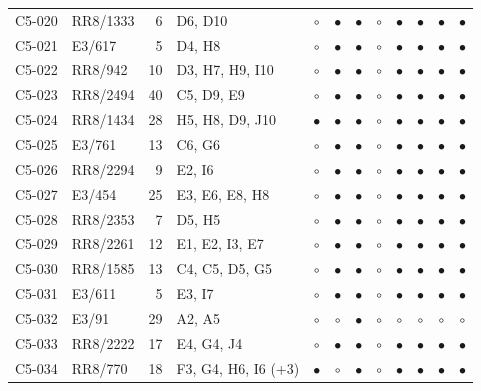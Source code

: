 {\begin{longtable}{llrp{3.9cm}cccccccc}
    C5-020 & RR8/1333 & 6 & D6, D10 & $\circ$ & $\bullet$ & $\bullet$ & $\circ$ & $\bullet$ & $\bullet$ & $\bullet$ & $\bullet$ \\
    C5-021 & E3/617 & 5 & D4, H8 & $\circ$ & $\bullet$ & $\bullet$ & $\circ$ & $\bullet$ & $\bullet$ & $\bullet$ & $\bullet$ \\
    C5-022 & RR8/942 & 10 & D3, H7, H9, I10 & $\circ$ & $\bullet$ & $\bullet$ & $\circ$ & $\bullet$ & $\bullet$ & $\bullet$ & $\bullet$ \\
    C5-023 & RR8/2494 & 40 & C5, D9, E9 & $\circ$ & $\bullet$ & $\bullet$ & $\circ$ & $\bullet$ & $\bullet$ & $\bullet$ & $\bullet$ \\
    C5-024 & RR8/1434 & 28 & H5, H8, D9, J10 & $\bullet$ & $\bullet$ & $\bullet$ & $\circ$ & $\bullet$ & $\bullet$ & $\bullet$ & $\bullet$ \\
    C5-025 & E3/761 & 13 & C6, G6 & $\circ$ & $\bullet$ & $\bullet$ & $\circ$ & $\bullet$ & $\bullet$ & $\bullet$ & $\bullet$ \\
    C5-026 & RR8/2294 & 9 & E2, I6 & $\circ$ & $\bullet$ & $\bullet$ & $\circ$ & $\bullet$ & $\bullet$ & $\bullet$ & $\bullet$ \\
    C5-027 & E3/454 & 25 & E3, E6, E8, H8 & $\circ$ & $\bullet$ & $\bullet$ & $\circ$ & $\bullet$ & $\bullet$ & $\bullet$ & $\bullet$ \\
    C5-028 & RR8/2353 & 7 & D5, H5 & $\circ$ & $\bullet$ & $\bullet$ & $\circ$ & $\bullet$ & $\bullet$ & $\bullet$ & $\bullet$ \\
    C5-029 & RR8/2261 & 12 & E1, E2, I3, E7 & $\circ$ & $\bullet$ & $\bullet$ & $\circ$ & $\bullet$ & $\bullet$ & $\bullet$ & $\bullet$ \\
    C5-030 & RR8/1585 & 13 & C4, C5, D5, G5 & $\circ$ & $\bullet$ & $\bullet$ & $\circ$ & $\bullet$ & $\bullet$ & $\bullet$ & $\bullet$ \\
    C5-031 & E3/611 & 5 & E3, I7 & $\circ$ & $\bullet$ & $\bullet$ & $\circ$ & $\bullet$ & $\bullet$ & $\bullet$ & $\bullet$ \\
    C5-032 & E3/91 & 29 & A2, A5 & $\circ$ & $\circ$ & $\bullet$ & $\circ$ & $\circ$ & $\circ$ & $\circ$ & $\circ$ \\
    C5-033 & RR8/2222 & 17 & E4, G4, J4 & $\circ$ & $\bullet$ & $\bullet$ & $\circ$ & $\bullet$ & $\bullet$ & $\bullet$ & $\bullet$ \\
    C5-034 & RR8/770 & 18 & F3, G4, H6, I6 (+3) & $\bullet$ & $\circ$ & $\bullet$ & $\circ$ & $\bullet$ & $\bullet$ & $\bullet$ & $\bullet$ \\

\end{longtable}}
